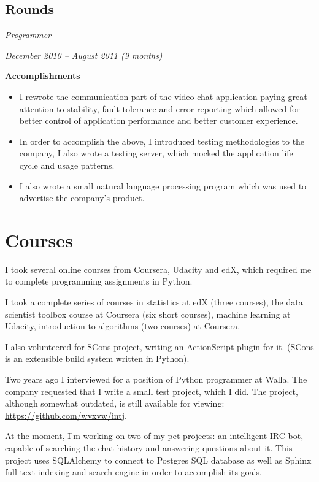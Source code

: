 \documentclass[11pt]{article}
\begin{document}
\subsection{Rounds}
\label{sec:orgheadline12}
\begin{description}
\item[{Position}] \emph{Programmer}
\item[{Term}] \emph{December 2010 – August 2011 (9 months)}
\item \textbf{Accomplishments}
\begin{itemize}
\item I rewrote the communication part of the video chat application paying
great attention to stability, fault tolerance and error reporting
which allowed for better control of application performance and better
customer experience.
\item In order to accomplish the above, I introduced testing methodologies to
the company, I also wrote a testing server, which mocked the application
life cycle and usage patterns.
\item I also wrote a small natural language processing program which was used
to advertise the company's product.
\end{itemize}
\end{description}

\section{Courses}
\label{sec:orgheadline14}
I took several online courses from Coursera, Udacity and edX, which required
me to complete programming assignments in Python.

I took a complete series of courses in statistics at edX (three courses),
the data scientist toolbox course at Coursera (six short courses), machine
learning at Udacity, introduction to algorithms (two courses) at Coursera.

I also volunteered for SCons project, writing an ActionScript plugin for it.
(SCons is an extensible build system written in Python).

Two years ago I interviewed for a position of Python programmer at Walla.  The
company requested that I write a small test project, which I did.  The
project, although somewhat outdated, is still available for viewing:
\url{https://github.com/wvxvw/intj}.

At the moment, I'm working on two of my pet projects: an intelligent IRC bot,
capable of searching the chat history and answering questions about it.  This
project uses SQLAlchemy to connect to Postgres SQL database as well as Sphinx
full text indexing and search engine in order to accomplish its goals.
\end{document}
